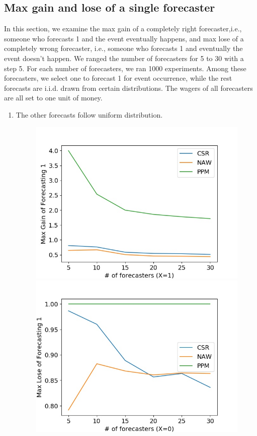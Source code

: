 \documentclass[english,10pt]{article}
\begin{document}
\subsection{Max gain and lose of a single forecaster}
	In this section, we examine the max gain of a completely right forecaster,i.e., someone who forecasts 1 and the event eventually happens, and max lose of a completely wrong forecaster, i.e., someone who forecasts 1 and eventually the event doesn't happen.
	We ranged the number of forecasters for 5 to 30 with a step 5. For each number of forecasters, we ran 1000 experiments. Among these forecasters, we select one to forecast 1 for event occurrence, while the rest forecasts are i.i.d. drawn from certain distributions. The wagers of all forecasters are all set to one unit of money.
	\begin{enumerate}
	\item The other forecasts follow uniform distribution.
	\begin{figure}[H]
        	\centering
        	\begin{minipage}{0.48\textwidth}
        	\includegraphics[width = \textwidth]{(UnifF_UnifW)Max_gain_of_forecasting_1.jpg}
        	\end{minipage}
        	\begin{minipage}{0.48\textwidth}
        	\includegraphics[width = \textwidth]{(UnifF_UnifW)Max_lose_of_forecasting_1.jpg}

\end{minipage}
\end{figure}
\end{enumerate}
\end{document}
